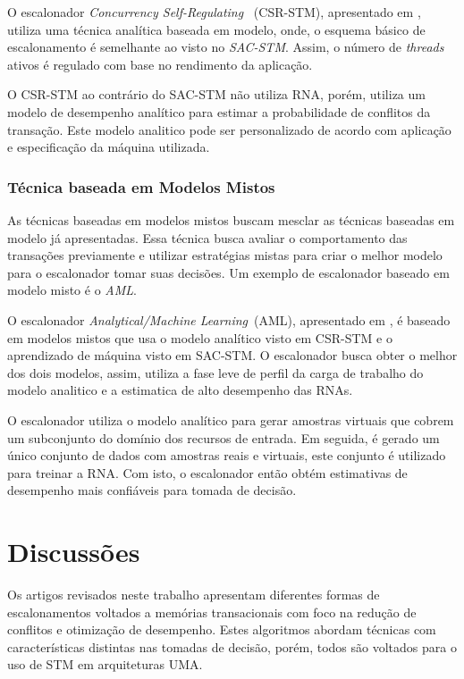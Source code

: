 \documentclass[ti]{texufpel} %
\begin{document}
O escalonador \emph{Concurrency Self-Regulating }~(CSR-STM), apresentado em \cite{sanzo13}, utiliza uma técnica analítica baseada em modelo, onde, o esquema básico de escalonamento é semelhante ao visto no \emph{SAC-STM}. Assim, o número de \emph{threads} ativos é regulado com base no rendimento da aplicação.

O CSR-STM ao contrário do SAC-STM não utiliza RNA, porém, utiliza um modelo de desempenho analítico para estimar a probabilidade de conflitos da transação. Este modelo analitico pode ser personalizado de acordo com aplicação e especificação da máquina utilizada.

\subsection{Técnica baseada em Modelos Mistos}

As técnicas baseadas em modelos mistos buscam mesclar as técnicas baseadas em modelo já apresentadas. Essa técnica busca avaliar o comportamento das transações previamente e utilizar estratégias mistas para criar o melhor modelo para o escalonador tomar suas decisões. Um exemplo de escalonador baseado em modelo  misto é o \emph{AML}.

O escalonador \emph{Analytical/Machine Learning}~(AML), apresentado em \cite{rughetti14}, é baseado em modelos mistos que usa o modelo analítico visto em CSR-STM e o aprendizado de máquina visto em SAC-STM. O escalonador busca obter o melhor dos dois modelos, assim, utiliza a fase leve de perfil da carga de trabalho do modelo analitico e a estimatica de alto desempenho das RNAs.

O escalonador utiliza o modelo analítico para gerar amostras virtuais que cobrem um subconjunto do domínio dos recursos de entrada. Em seguida, é gerado um único conjunto de dados com amostras reais e virtuais, este conjunto é utilizado para treinar a RNA. Com isto, o escalonador então obtém estimativas de desempenho mais confiáveis para tomada de decisão.

\chapter{Discussões}

Os artigos revisados neste trabalho apresentam diferentes formas de escalonamentos voltados a memórias transacionais com foco na redução de conflitos e otimização de desempenho. Estes algoritmos abordam técnicas com características distintas nas tomadas de decisão, porém, todos são voltados para o uso de STM em arquiteturas UMA.
\end{document}
